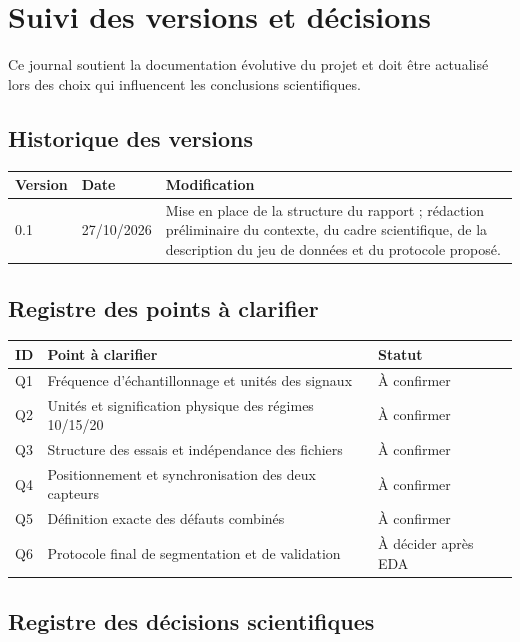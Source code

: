 \chapter{Suivi des versions et décisions}
\label{ann:suivi}
Ce journal soutient la documentation évolutive du projet et doit être actualisé lors des choix qui influencent les conclusions scientifiques.

\section{Historique des versions}
\begin{longtable}{@{}p{22mm}p{33mm}p{88mm}@{}}
\toprule
\bfseries Version & \bfseries Date & \bfseries Modification\\
\midrule
\endhead
0.1 & 27/10/2026 & Mise en place de la structure du rapport ; rédaction préliminaire du contexte, du cadre scientifique, de la description du jeu de données et du protocole proposé.\\
\bottomrule
\end{longtable}

\section{Registre des points à clarifier}
\begin{longtable}{@{}p{14mm}p{89mm}p{40mm}@{}}
\toprule
\bfseries ID & \bfseries Point à clarifier & \bfseries Statut\\
\midrule
\endhead
Q1 & Fréquence d'échantillonnage et unités des signaux & À confirmer\\
Q2 & Unités et signification physique des régimes 10/15/20 & À confirmer\\
Q3 & Structure des essais et indépendance des fichiers & À confirmer\\
Q4 & Positionnement et synchronisation des deux capteurs & À confirmer\\
Q5 & Définition exacte des défauts combinés & À confirmer\\
Q6 & Protocole final de segmentation et de validation & À décider après EDA\\
\bottomrule
\end{longtable}

\section{Registre des décisions scientifiques}
